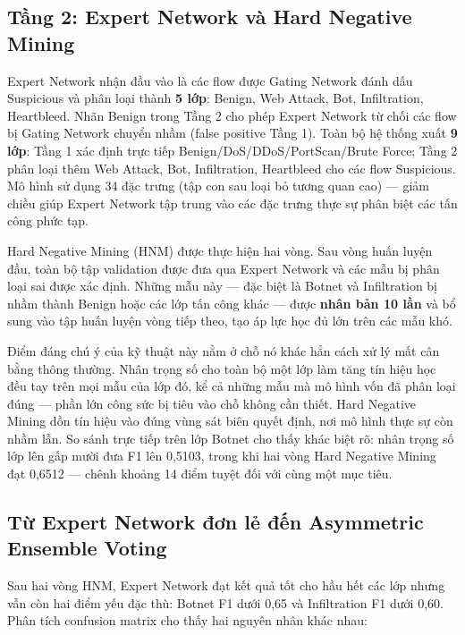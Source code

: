 \documentclass[../DoAn.tex]{subfiles}
\begin{document}
\subsection{Tầng 2: Expert Network và Hard Negative Mining}
\label{subsec:gd2-stage2}

Expert Network nhận đầu vào là các flow được Gating Network đánh dấu Suspicious và phân loại thành \textbf{5 lớp}: Benign, Web Attack, Bot, Infiltration, Heartbleed. Nhãn Benign trong Tầng 2 cho phép Expert Network từ chối các flow bị Gating Network chuyển nhầm (false positive Tầng 1). Toàn bộ hệ thống xuất \textbf{9 lớp}: Tầng 1 xác định trực tiếp Benign/DoS/DDoS/PortScan/Brute Force; Tầng 2 phân loại thêm Web Attack, Bot, Infiltration, Heartbleed cho các flow Suspicious. Mô hình sử dụng 34 đặc trưng (tập con sau loại bỏ tương quan cao) --- giảm chiều giúp Expert Network tập trung vào các đặc trưng thực sự phân biệt các tấn công phức tạp.

Hard Negative Mining (HNM) được thực hiện hai vòng. Sau vòng huấn luyện đầu, toàn bộ tập validation được đưa qua Expert Network và các mẫu bị phân loại sai được xác định. Những mẫu này --- đặc biệt là Botnet và Infiltration bị nhầm thành Benign hoặc các lớp tấn công khác --- được \textbf{nhân bản 10 lần} và bổ sung vào tập huấn luyện vòng tiếp theo, tạo áp lực học đủ lớn trên các mẫu khó.

Điểm đáng chú ý của kỹ thuật này nằm ở chỗ nó khác hẳn cách xử lý mất cân bằng thông thường. Nhân trọng số cho toàn bộ một lớp làm tăng tín hiệu học đều tay trên mọi mẫu của lớp đó, kể cả những mẫu mà mô hình vốn đã phân loại đúng --- phần lớn công sức bị tiêu vào chỗ không cần thiết. Hard Negative Mining dồn tín hiệu vào đúng vùng sát biên quyết định, nơi mô hình thực sự còn nhầm lẫn. So sánh trực tiếp trên lớp Botnet cho thấy khác biệt rõ: nhân trọng số lớp lên gấp mười đưa F1 lên 0,5103, trong khi hai vòng Hard Negative Mining đạt 0,6512 --- chênh khoảng 14 điểm tuyệt đối với cùng một mục tiêu.

\subsection{Từ Expert Network đơn lẻ đến Asymmetric Ensemble Voting}
\label{subsec:gd2-motivation-ensemble}

Sau hai vòng HNM, Expert Network đạt kết quả tốt cho hầu hết các lớp nhưng vẫn còn hai điểm yếu đặc thù: Botnet F1 dưới 0,65 và Infiltration F1 dưới 0,60. Phân tích confusion matrix cho thấy hai nguyên nhân khác nhau:
\end{document}
